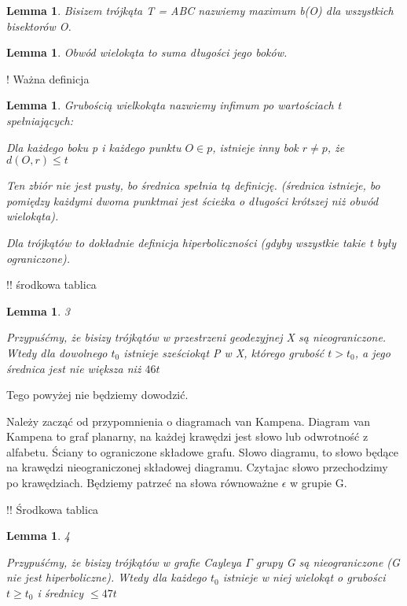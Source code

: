 \documentclass[twoside]{article}
\newtheorem{lemma}[theorem]{Lemma}
\begin{document}
\begin{lemma}

Bisizem trójkąta T = ABC nazwiemy maximum b(O) dla wszystkich bisektorów O.

\end{lemma}

\begin{lemma}

Obwód wielokąta to suma długości jego boków.

\end{lemma}

! Ważna definicja

\begin{lemma}

Grubością wielkokąta nazwiemy infimum po wartościach t spełniających:

Dla każdego boku p i każdego punktu $O \in p$, istnieje inny bok $r \neq p$, że $d(O, r) \leq t$

Ten zbiór nie jest pusty, bo średnica spełnia tą definicję.
(średnica istnieje, bo pomiędzy każdymi dwoma punktmai jest ścieżka o długości krótszej niż obwód wielokąta).

Dla trójkątów to dokładnie definicja hiperboliczności (gdyby wszystkie takie t były ograniczone).

\end{lemma}

!! środkowa tablica

\begin{lemma}

{\huge 3}

Przypuśćmy, że bisizy trójkątów w przestrzeni geodezyjnej X są nieograniczone. Wtedy dla dowolnego $t_{0}$ istnieje sześciokąt P w X, którego grubość $t > t_{0}$, a jego średnica jest nie większa niż $46 t$

\end{lemma}

Tego powyżej nie będziemy dowodzić.

Należy zacząć od przypomnienia o diagramach van Kampena.
Diagram van Kampena to graf planarny, na każdej krawędzi jest słowo lub odwrotność z alfabetu. Ściany to ograniczone składowe grafu. Słowo diagramu, to słowo będące na krawędzi nieograniczonej składowej diagramu. Czytajac słowo przechodzimy  po krawędziach. Będziemy patrzeć na słowa równoważne $\epsilon$ w grupie G.

!! Środkowa tablica

\begin{lemma}

{\huge 4}

Przypuśćmy, że bisizy trójkątów w grafie Cayleya $\Gamma$ grupy G są nieograniczone (G nie jest hiperboliczne). Wtedy dla każdego $t_{0}$ istnieje w niej wielokąt o grubości $t \geq t_{0}$ i średnicy $\leq 47 t$

\end{lemma}
\end{document}
